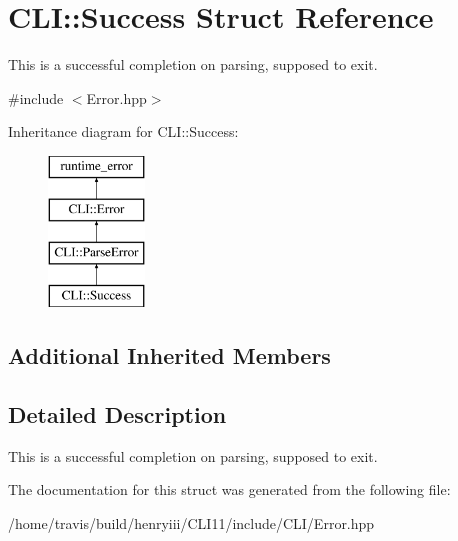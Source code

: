 \hypertarget{struct_c_l_i_1_1_success}{}\section{C\+LI\+:\+:Success Struct Reference}
\label{struct_c_l_i_1_1_success}


This is a successful completion on parsing, supposed to exit.  




{\ttfamily \#include $<$Error.\+hpp$>$}

Inheritance diagram for C\+LI\+:\+:Success\+:\begin{figure}[H]
\begin{center}
\leavevmode
\includegraphics[height=4.000000cm]{struct_c_l_i_1_1_success}
\end{center}
\end{figure}
\subsection*{Additional Inherited Members}


\subsection{Detailed Description}
This is a successful completion on parsing, supposed to exit. 

The documentation for this struct was generated from the following file\+:\begin{DoxyCompactItemize}
\item 
/home/travis/build/henryiii/\+C\+L\+I11/include/\+C\+L\+I/Error.\+hpp\end{DoxyCompactItemize}
